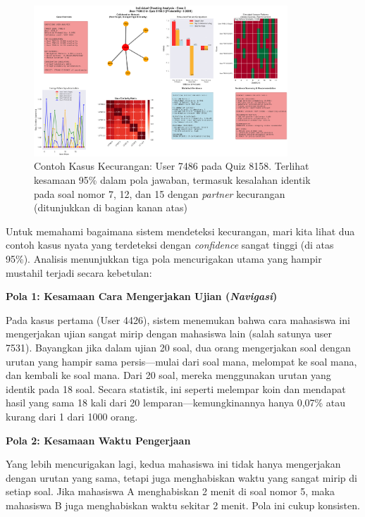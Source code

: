 \begin{figure}[h!]
    \centering
    \includegraphics[width=0.85\textwidth]{newfigures/individual_case_2_user_7486.0_quiz_8158.0.png}
    \caption{Contoh Kasus Kecurangan: User 7486 pada Quiz 8158. Terlihat kesamaan 95\% dalam pola jawaban, termasuk kesalahan identik pada soal nomor 7, 12, dan 15 dengan \textit{partner} kecurangan (ditunjukkan di bagian kanan atas)}
    \label{fig:case2}
\end{figure}

Untuk memahami bagaimana sistem mendeteksi kecurangan, mari kita lihat dua contoh kasus nyata yang terdeteksi dengan \textit{confidence} sangat tinggi (di atas 95\%). Analisis menunjukkan tiga pola mencurigakan utama yang hampir mustahil terjadi secara kebetulan:

\textbf{Pola 1: Kesamaan Cara Mengerjakan Ujian (\textit{Navigasi})}

Pada kasus pertama (User 4426), sistem menemukan bahwa cara mahasiswa ini mengerjakan ujian sangat mirip dengan mahasiswa lain (salah satunya user 7531). Bayangkan jika dalam ujian 20 soal, dua orang mengerjakan soal dengan urutan yang hampir sama persis—mulai dari soal mana, melompat ke soal mana, dan kembali ke soal mana. Dari 20 soal, mereka menggunakan urutan yang identik pada 18 soal. Secara statistik, ini seperti melempar koin dan mendapat hasil yang sama 18 kali dari 20 lemparan—kemungkinannya hanya 0,07\% atau kurang dari 1 dari 1000 orang.

\textbf{Pola 2: Kesamaan Waktu Pengerjaan}

Yang lebih mencurigakan lagi, kedua mahasiswa ini tidak hanya mengerjakan dengan urutan yang sama, tetapi juga menghabiskan waktu yang sangat mirip di setiap soal. Jika mahasiswa A menghabiskan 2 menit di soal nomor 5, maka mahasiswa B juga menghabiskan waktu sekitar 2 menit. Pola ini cukup konsisten.

